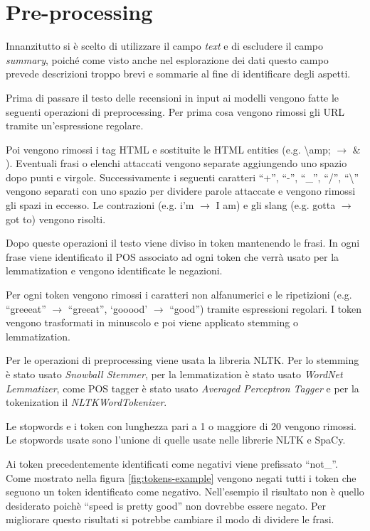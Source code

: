 \section{Pre-processing}
Innanzitutto si è scelto di utilizzare il campo \textit{text} e di escludere il campo \textit{summary}, poiché come visto anche nel esplorazione dei dati questo campo prevede descrizioni troppo brevi e sommarie al fine di identificare degli aspetti.

Prima di passare il testo delle recensioni in input ai modelli vengono fatte le seguenti operazioni di preprocessing. Per prima cosa vengono rimossi gli URL tramite un'espressione regolare. 

Poi vengono rimossi i tag HTML e sostituite le HTML entities (e.g. \textbackslash amp; $\rightarrow$ $\&$). Eventuali frasi o elenchi attaccati vengono separate aggiungendo uno spazio dopo punti e virgole. Successivamente i seguenti caratteri ``+'', ``-'', ``\_'', ``/'', ``\textbackslash'' vengono separati con uno spazio per dividere parole attaccate e vengono rimossi gli spazi in eccesso. Le contrazioni (e.g. i'm $\rightarrow$ I am) e gli slang (e.g. gotta $\rightarrow$ got to) vengono risolti.

Dopo queste operazioni il testo viene diviso in token mantenendo le frasi. In ogni frase viene 
identificato il POS associato ad ogni token che verrà usato per la lemmatization e vengono identificate le negazioni.

Per ogni token vengono rimossi i caratteri non alfanumerici e le ripetizioni (e.g. ``greeeat'' $\rightarrow$ ``greeat'', `gooood' $\rightarrow$ ``good'') tramite espressioni regolari. I token vengono trasformati in minuscolo e poi viene applicato stemming o lemmatization. 

Per le operazioni di preprocessing viene usata la libreria NLTK. Per lo stemming è stato
usato \textit{Snowball Stemmer}, per la lemmatization è stato usato \textit{WordNet Lemmatizer}, come POS tagger è stato usato \textit{Averaged Perceptron Tagger} e per la tokenization il \textit{NLTKWordTokenizer}.

Le stopwords e i token con lunghezza pari a 1 o maggiore di 20 vengono rimossi. Le stopwords usate sono l'unione di quelle usate nelle librerie NLTK e SpaCy.

Ai token precedentemente identificati come negativi viene prefissato ``not\_''. Come mostrato 
nella figura \ref{fig:tokens-example} vengono negati tutti i token che seguono un token identificato
come negativo. Nell'esempio il risultato non è quello desiderato poichè ``speed is pretty good'' non dovrebbe essere negato. Per migliorare questo risultati si potrebbe cambiare il modo di 
dividere le frasi.

